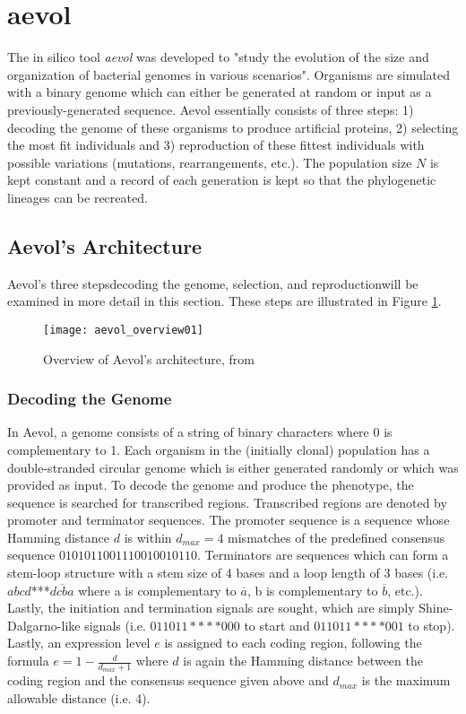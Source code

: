 \section{aevol}
The in silico tool \textit{aevol} was developed to "study the evolution of the size and organization of bacterial genomes in various scenarios"\cite{Batut.2013}. Organisms are simulated with a binary genome which can either be generated at random or input as a previously-generated sequence. Aevol essentially consists of three steps: 1) decoding the genome of these organisms to produce artificial proteins, 2) selecting the most fit individuals and 3) reproduction of these fittest individuals with possible variations (mutations, rearrangements, etc.). The population size $N$ is kept constant and a record of each generation is kept so that the phylogenetic lineages can be recreated.

\subsection{Aevol's Architecture}
Aevol's three steps\textemdash decoding the genome, selection, and reproduction\textemdash will be examined in more detail in this section. These steps are illustrated in Figure \ref{fig:aevol_overview01}. 

\begin{figure}[H]\label{fig:aevol_overview01}
	\texttt{[image: aevol\_overview01]}
	\centering
	\caption[Overview of Aevol's architecture.]{Overview of Aevol's architecture, from \cite{Batut.2013}}
\end{figure}
\subsubsection{Decoding the Genome}
In Aevol, a genome consists of a string of binary characters where 0 is complementary to 1. Each organism in the (initially clonal) population has a double-stranded circular genome which is either generated randomly or which was provided as input. To decode the genome and produce the phenotype, the sequence is searched for transcribed regions. Transcribed regions are denoted by promoter and terminator sequences. The promoter sequence is a sequence whose Hamming distance $d$ is within $d_{max} = 4$ mismatches of the predefined consensus sequence $0101011001110010010110$. Terminators are sequences which can form a stem-loop structure with a stem size of 4 bases and a loop length of 3 bases (i.e. $abcd$***$\overline{dcba}$ where a is complementary to $\overline{a}$, b is complementary to $\overline{b}$, etc.). Lastly, the initiation and termination signals are sought, which are simply Shine-Dalgarno-like signals (i.e. $011011****000$ to start and $011011****001$ to stop). Lastly, an expression level $e$ is assigned to each coding region, following the formula $e = 1 - \frac{d}{d_{max} + 1}$ where $d$ is again the Hamming distance between the coding region and the consensus sequence given above and $d_{max}$ is the maximum allowable distance (i.e. 4). 

